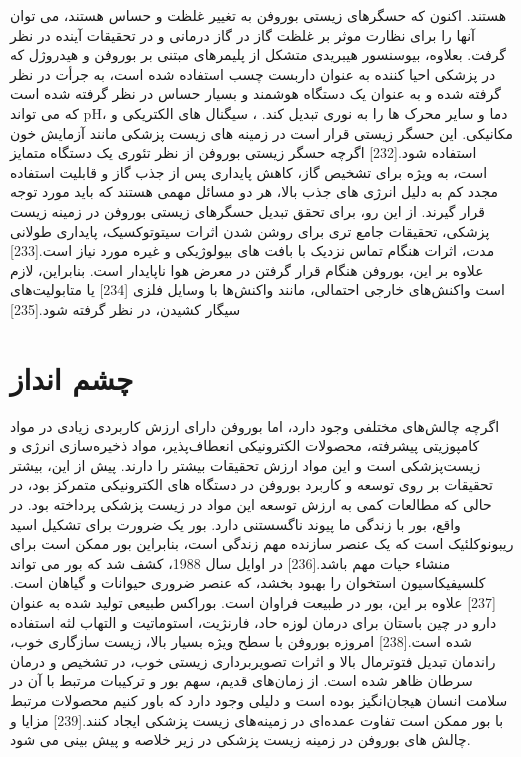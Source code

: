 هستند. اکنون که حسگرهای زیستی بوروفن به تغییر غلظت  و  حساس هستند، می توان آنها را برای نظارت موثر بر غلظت گاز در گاز درمانی  و  در تحقیقات آینده در نظر گرفت. بعلاوه، بیوسنسور هیبریدی متشکل از پلیمرهای مبتنی بر بوروفن و هیدروژل که در پزشکی احیا کننده به عنوان داربست چسب استفاده شده است، به جرأت در نظر گرفته شده و به عنوان یک دستگاه هوشمند و بسیار حساس در نظر گرفته شده است که می تواند pH، دما و سایر محرک ها را به نوری تبدیل کند. ، سیگنال های الکتریکی و مکانیکی. این حسگر زیستی قرار است در زمینه های زیست پزشکی مانند آزمایش خون استفاده شود.[232] اگرچه حسگر زیستی بوروفن از نظر تئوری یک دستگاه متمایز است، به ویژه برای تشخیص گاز، کاهش پایداری پس از جذب گاز و قابلیت استفاده مجدد کم به دلیل انرژی های جذب بالا، هر دو مسائل مهمی هستند که باید مورد توجه قرار گیرند. از این رو، برای تحقق تبدیل حسگرهای زیستی بوروفن در زمینه زیست پزشکی، تحقیقات جامع تری برای روشن شدن اثرات سیتوتوکسیک، پایداری طولانی مدت، اثرات هنگام تماس نزدیک با بافت های بیولوژیکی و غیره مورد نیاز است.[233] علاوه بر این، بوروفن هنگام قرار گرفتن در معرض هوا ناپایدار است. بنابراین، لازم است واکنش‌های خارجی احتمالی، مانند واکنش‌ها با وسایل فلزی [234] یا متابولیت‌های سیگار کشیدن، در نظر گرفته شود.[235]

\section{چشم انداز}
اگرچه چالش‌های مختلفی وجود دارد، اما بوروفن دارای ارزش کاربردی زیادی در مواد کامپوزیتی پیشرفته، محصولات الکترونیکی انعطاف‌پذیر، مواد ذخیره‌سازی انرژی و زیست‌پزشکی است و این مواد ارزش تحقیقات بیشتر را دارند. پیش از این، بیشتر تحقیقات بر روی توسعه و کاربرد بوروفن در دستگاه های الکترونیکی متمرکز بود، در حالی که مطالعات کمی به ارزش توسعه این مواد در زیست پزشکی پرداخته بود. در واقع، بور با زندگی ما پیوند ناگسستنی دارد. بور یک ضرورت برای تشکیل اسید ریبونوکلئیک است که یک عنصر سازنده مهم زندگی است، بنابراین بور ممکن است برای منشاء حیات مهم باشد.[236] در اوایل سال 1988، کشف شد که بور می تواند کلسیفیکاسیون استخوان را بهبود بخشد، که عنصر ضروری حیوانات و گیاهان است.[237] علاوه بر این، بور در طبیعت فراوان است. بوراکس طبیعی تولید شده  به عنوان دارو در چین باستان برای درمان لوزه حاد، فارنژیت، استوماتیت و التهاب لثه استفاده شده است.[238] امروزه بوروفن با سطح ویژه بسیار بالا، زیست سازگاری خوب، راندمان تبدیل فتوترمال بالا و اثرات تصویربرداری زیستی خوب، در تشخیص و درمان سرطان ظاهر شده است. از زمان‌های قدیم، سهم بور و ترکیبات مرتبط با آن در سلامت انسان هیجان‌انگیز بوده است و دلیلی وجود دارد که باور کنیم محصولات مرتبط با بور ممکن است تفاوت عمده‌ای در زمینه‌های زیست پزشکی ایجاد کنند.[239] مزایا و چالش های بوروفن در زمینه زیست پزشکی در زیر خلاصه و پیش بینی می شود.

